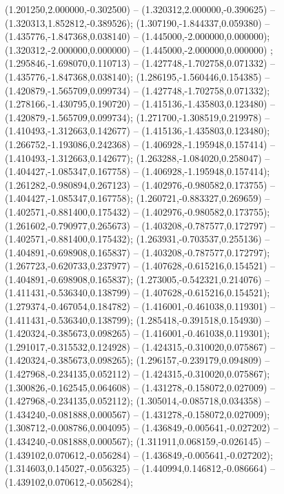  (1.201250,2.000000,-0.302500) -- (1.320312,2.000000,-0.390625) -- (1.320313,1.852812,-0.389526);
 (1.307190,-1.844337,0.059380) -- (1.435776,-1.847368,0.038140) -- (1.445000,-2.000000,0.000000);
 (1.320312,-2.000000,0.000000) -- (1.445000,-2.000000,0.000000) ;
 (1.295846,-1.698070,0.110713) -- (1.427748,-1.702758,0.071332) -- (1.435776,-1.847368,0.038140);
 (1.286195,-1.560446,0.154385) -- (1.420879,-1.565709,0.099734) -- (1.427748,-1.702758,0.071332);
 (1.278166,-1.430795,0.190720) -- (1.415136,-1.435803,0.123480) -- (1.420879,-1.565709,0.099734);
 (1.271700,-1.308519,0.219978) -- (1.410493,-1.312663,0.142677) -- (1.415136,-1.435803,0.123480);
 (1.266752,-1.193086,0.242368) -- (1.406928,-1.195948,0.157414) -- (1.410493,-1.312663,0.142677);
 (1.263288,-1.084020,0.258047) -- (1.404427,-1.085347,0.167758) -- (1.406928,-1.195948,0.157414);
 (1.261282,-0.980894,0.267123) -- (1.402976,-0.980582,0.173755) -- (1.404427,-1.085347,0.167758);
 (1.260721,-0.883327,0.269659) -- (1.402571,-0.881400,0.175432) -- (1.402976,-0.980582,0.173755);
 (1.261602,-0.790977,0.265673) -- (1.403208,-0.787577,0.172797) -- (1.402571,-0.881400,0.175432);
 (1.263931,-0.703537,0.255136) -- (1.404891,-0.698908,0.165837) -- (1.403208,-0.787577,0.172797);
 (1.267723,-0.620733,0.237977) -- (1.407628,-0.615216,0.154521) -- (1.404891,-0.698908,0.165837);
 (1.273005,-0.542321,0.214076) -- (1.411431,-0.536340,0.138799) -- (1.407628,-0.615216,0.154521);
 (1.279374,-0.467054,0.184782) -- (1.416001,-0.461038,0.119301) -- (1.411431,-0.536340,0.138799);
 (1.285418,-0.391518,0.154930) -- (1.420324,-0.385673,0.098265) -- (1.416001,-0.461038,0.119301);
 (1.291017,-0.315532,0.124928) -- (1.424315,-0.310020,0.075867) -- (1.420324,-0.385673,0.098265);
 (1.296157,-0.239179,0.094809) -- (1.427968,-0.234135,0.052112) -- (1.424315,-0.310020,0.075867);
 (1.300826,-0.162545,0.064608) -- (1.431278,-0.158072,0.027009) -- (1.427968,-0.234135,0.052112);
 (1.305014,-0.085718,0.034358) -- (1.434240,-0.081888,0.000567) -- (1.431278,-0.158072,0.027009);
 (1.308712,-0.008786,0.004095) -- (1.436849,-0.005641,-0.027202) -- (1.434240,-0.081888,0.000567);
 (1.311911,0.068159,-0.026145) -- (1.439102,0.070612,-0.056284) -- (1.436849,-0.005641,-0.027202);
 (1.314603,0.145027,-0.056325) -- (1.440994,0.146812,-0.086664) -- (1.439102,0.070612,-0.056284);
